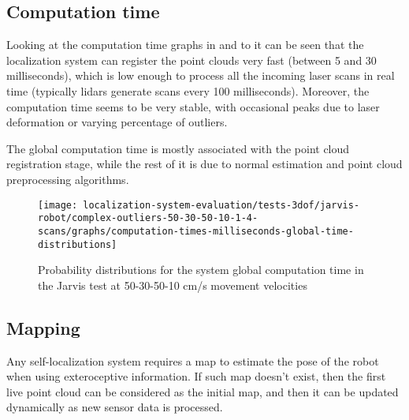 \subsection{Computation time}

Looking at the computation time graphs in  and to  it can be seen that the localization system can register the point clouds very fast (between 5 and 30 milliseconds), which is low enough to process all the incoming laser scans in real time (typically \glspl{lidar} generate scans every 100 milliseconds). Moreover, the computation time seems to be very stable, with occasional peaks due to laser deformation or varying percentage of outliers.

The global computation time is mostly associated with the point cloud registration stage, while the rest of it is due to normal estimation and point cloud preprocessing algorithms.

\begin{figure}[H]
	\centering
	\texttt{[image: localization-system-evaluation/tests-3dof/jarvis-robot/complex-outliers-50-30-50-10-1-4-scans/graphs/computation-times-milliseconds-global-time-distributions]}
	\caption{Probability distributions for the  system global computation time in the Jarvis test at 50-30-50-10 cm/s movement velocities}
	\label{fig:localization-system-evaluation_complex-path-with-outliers-50-30-50-10cm-per-sec-velocity-1-4-scans-computation-time}
\end{figure}


\subsection{Mapping}

Any self-localization system requires a map to estimate the pose of the robot when using exteroceptive information. If such map doesn't exist, then the first live point cloud can be considered as the initial map, and then it can be updated dynamically as new sensor data is processed.

